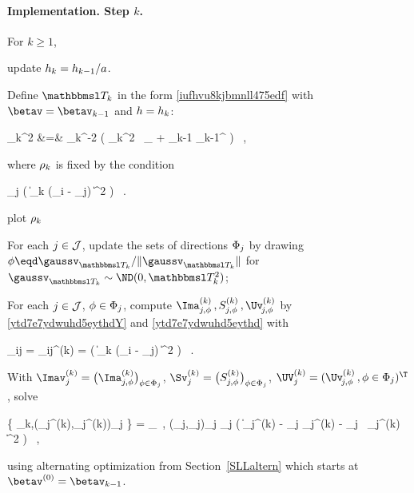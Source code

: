 \paragraph{Implementation. Step \( k \).}
For \( k \geq 1 \), 
\begin{mylist}

\item 
update \( h_{k} = h_{k-1} / a \).

\item 
Define \( \TEDR_{k} \) in the form \eqref{iufhvu8kjbmnll475edf} with \( \betav = \betav_{k-1} \) and \( h = h_{k} \):
\begin{EQA}[rcl]
	\TEDR_{k}^{2}
	&=&
	\hiso_{k}^{-2} \bigl( \aniso_{k}^{2} \, \Id_{\dimd} + \betav_{k-1} \betav_{k-1}^{\T} \bigr)
	\, ,
\label{iufhvu8kjbmnll475edfk}
\end{EQA}
where
\( \rho_{k} \) is fixed by the condition
\begin{EQA}[c]
	 \sum_{j \in \JJJ} \sumi \Kern\bigl( \| \TEDR_{k} (\Xv_{i} - \xv_{j}) \|^{2}
	\bigr)
	\geq 
	\nmin
	\, .
	\qquad 
\label{jhgiverkytde4w34etycja}
\end{EQA}
{\color{blue} plot \( \rho_{k} \)}

\item
For each \( j \in \mathcal{J} \),
update the sets of directions \( \Phi_{j} \) by drawing \( \sph \eqd \gaussv_{\TEDR_{k}}/\| \gaussv_{\TEDR_{k}} \| \)
for \( \gaussv_{\TEDR_{k}} \sim \ND(0,\TEDR_{k}^{2}) \);

\item 
For each \( j \in \mathcal{J} \), \( \phi \in \Phi_{j} \), 
compute \( \Ima_{j,\sph}^{(k)} \, , S_{j,\sph}^{(k)} \, , \Uv_{\jm,\sph}^{(k)} \)
by \eqref{ytd7e7ydwuhd5eythdY} and \eqref{ytd7e7ydwuhd5eythd} with
\begin{EQA}[c]
	\weight_{ij} 
	= 
	\weight_{ij}^{(k)}
	= 
	\Kern\bigl( \| \TEDR_{k} (\Xv_{i} - \xv_{j}) \|^{2} \bigr) 
	\, .
\end{EQA}

\item 
With 
\( \Imav_{j}^{(k)} = \bigl( \Ima_{j,\sph}^{(k)} \bigr)_{\sph \in \Sph_{j}} \),
\( \Sv_{j}^{(k)} = \bigl( S_{j,\sph}^{(k)} \bigr)_{\sph \in \Sph_{j}} \),
\( \UV_{j}^{(k)} = (\Uv_{\jm,\sph}^{(k)} \, , \sph \in \Sph_{j})^{\T} \),
solve
\begin{EQA}[c]
	\bigl\{ \betav_{k},(\fcn_{j}^{(k)},\fcl_{j}^{(k)})_{j \in \JJJ} \bigr\}
	=
	\arginf_{\betav \, , (\fcn_{j},\fclv_{j})_{j \in \JJJ}}
	\sum_{j \in \JJJ} \Bigl( \| \Imav_{j}^{(k)} - \fcn_{j} \Sv_{j}^{(k)} - \fcl_{j} \, \UV_{j}^{(k)} \betav \bigr\|^{2} \Bigr) 
	\, ,
	\qquad
\end{EQA}
using alternating optimization from Section~\ref{SLLaltern} which starts at \( \betav^{(0)} = \betav_{k-1} \).



\end{mylist}
